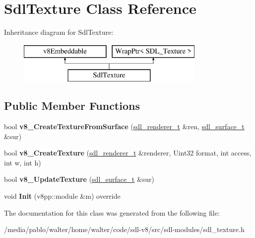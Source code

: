\hypertarget{classSdlTexture}{}\section{Sdl\+Texture Class Reference}
\label{classSdlTexture}
Inheritance diagram for Sdl\+Texture\+:\begin{figure}[H]
\begin{center}
\leavevmode
\includegraphics[height=2.000000cm]{classSdlTexture}
\end{center}
\end{figure}
\subsection*{Public Member Functions}
\begin{DoxyCompactItemize}
\item 
\mbox{\label{classSdlTexture_ad9b311e0956c755a2f7dd865ea600af1}} 
bool {\bfseries v8\+\_\+\+Create\+Texture\+From\+Surface} (\mbox{\hyperlink{classWrapPtr}{sdl\+\_\+renderer\+\_\+t}} \&ren, \mbox{\hyperlink{classWrapPtr}{sdl\+\_\+surface\+\_\+t}} \&sur)
\item 
\mbox{\label{classSdlTexture_ae1d48e158727088de951530ff1d67ae3}} 
bool {\bfseries v8\+\_\+\+Create\+Texture} (\mbox{\hyperlink{classWrapPtr}{sdl\+\_\+renderer\+\_\+t}} \&renderer, Uint32 format, int access, int w, int h)
\item 
\mbox{\label{classSdlTexture_a5bbaf9b3aed07a57a6e9dea9ee413549}} 
bool {\bfseries v8\+\_\+\+Update\+Texture} (\mbox{\hyperlink{classWrapPtr}{sdl\+\_\+surface\+\_\+t}} \&sur)
\item 
\mbox{\label{classSdlTexture_a86281ab73331a718638e0f2934ba39ed}} 
void {\bfseries Init} (v8pp\+::module \&m) override
\end{DoxyCompactItemize}


The documentation for this class was generated from the following file\+:\begin{DoxyCompactItemize}
\item 
/media/pablo/walter/home/walter/code/sdl-\/v8/src/sdl-\/modules/sdl\+\_\+texture.\+h\end{DoxyCompactItemize}
